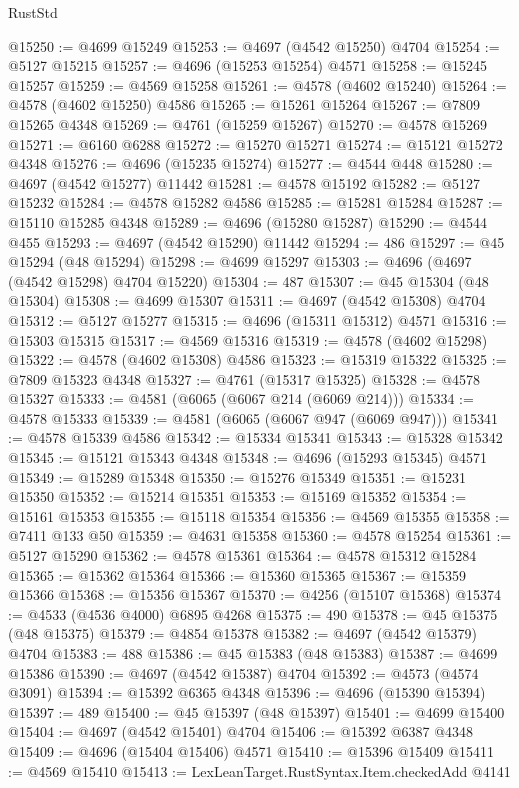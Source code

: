 \begin{lexlean}{RustStd}
\begin{coremodule}
@15250 := @4699 @15249
@15253 := @4697 (@4542 @15250) @4704
@15254 := @5127 @15215
@15257 := @4696 (@15253 @15254) @4571
@15258 := @15245 @15257
@15259 := @4569 @15258
@15261 := @4578 (@4602 @15240)
@15264 := @4578 (@4602 @15250) @4586
@15265 := @15261 @15264
@15267 := @7809 @15265 @4348
@15269 := @4761 (@15259 @15267)
@15270 := @4578 @15269
@15271 := @6160 @6288
@15272 := @15270 @15271
@15274 := @15121 @15272 @4348
@15276 := @4696 (@15235 @15274)
@15277 := @4544 @448
@15280 := @4697 (@4542 @15277) @11442
@15281 := @4578 @15192
@15282 := @5127 @15232
@15284 := @4578 @15282 @4586
@15285 := @15281 @15284
@15287 := @15110 @15285 @4348
@15289 := @4696 (@15280 @15287)
@15290 := @4544 @455
@15293 := @4697 (@4542 @15290) @11442
@15294 := 486
@15297 := @45 @15294 (@48 @15294)
@15298 := @4699 @15297
@15303 := @4696 (@4697 (@4542 @15298) @4704 @15220)
@15304 := 487
@15307 := @45 @15304 (@48 @15304)
@15308 := @4699 @15307
@15311 := @4697 (@4542 @15308) @4704
@15312 := @5127 @15277
@15315 := @4696 (@15311 @15312) @4571
@15316 := @15303 @15315
@15317 := @4569 @15316
@15319 := @4578 (@4602 @15298)
@15322 := @4578 (@4602 @15308) @4586
@15323 := @15319 @15322
@15325 := @7809 @15323 @4348
@15327 := @4761 (@15317 @15325)
@15328 := @4578 @15327
@15333 := @4581 (@6065 (@6067 @214 (@6069 @214)))
@15334 := @4578 @15333
@15339 := @4581 (@6065 (@6067 @947 (@6069 @947)))
@15341 := @4578 @15339 @4586
@15342 := @15334 @15341
@15343 := @15328 @15342
@15345 := @15121 @15343 @4348
@15348 := @4696 (@15293 @15345) @4571
@15349 := @15289 @15348
@15350 := @15276 @15349
@15351 := @15231 @15350
@15352 := @15214 @15351
@15353 := @15169 @15352
@15354 := @15161 @15353
@15355 := @15118 @15354
@15356 := @4569 @15355
@15358 := @7411 @133 @50
@15359 := @4631 @15358
@15360 := @4578 @15254
@15361 := @5127 @15290
@15362 := @4578 @15361
@15364 := @4578 @15312 @15284
@15365 := @15362 @15364
@15366 := @15360 @15365
@15367 := @15359 @15366
@15368 := @15356 @15367
@15370 := @4256 (@15107 @15368)
@15374 := @4533 (@4536 @4000) @6895 @4268
@15375 := 490
@15378 := @45 @15375 (@48 @15375)
@15379 := @4854 @15378
@15382 := @4697 (@4542 @15379) @4704
@15383 := 488
@15386 := @45 @15383 (@48 @15383)
@15387 := @4699 @15386
@15390 := @4697 (@4542 @15387) @4704
@15392 := @4573 (@4574 @3091)
@15394 := @15392 @6365 @4348
@15396 := @4696 (@15390 @15394)
@15397 := 489
@15400 := @45 @15397 (@48 @15397)
@15401 := @4699 @15400
@15404 := @4697 (@4542 @15401) @4704
@15406 := @15392 @6387 @4348
@15409 := @4696 (@15404 @15406) @4571
@15410 := @15396 @15409
@15411 := @4569 @15410
@15413 := LexLeanTarget.RustSyntax.Item.checkedAdd @4141

\end{coremodule}
\end{lexlean}
